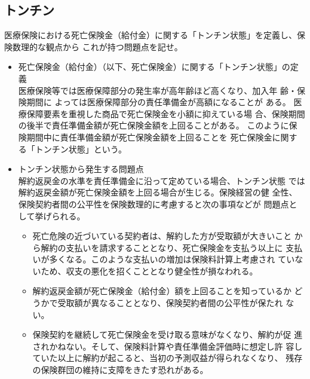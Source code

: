 \documentclass[report,gutter=10mm,fore-edge=10mm,uplatex,dvipdfmx]{jlreq}
\begin{document}
\subsection{トンチン}
医療保険における死亡保険金（給付金）に関する「トンチン状態」を定義し、保険数理的な観点から
これが持つ問題点を記せ。
\begin{itemize}
 \item  死亡保険金（給付金）（以下、死亡保険金）に関する「トンチン状態」の定義\\
 医療保険等では医療保障部分の発生率が高年齢ほど高くなり、加入年 齢・保険期間に
よっては医療保障部分の責任準備金が高額になることが ある。
医療保障要素を重視した商品で死亡保険金を小額に抑えている場
 合、保険期間の後半で責任準備金額が死亡保険金額を上回ることがある。
 このように保険期間中に責任準備金額が死亡保険金額を上回ることを
 死亡保険金に関する「トンチン状態」という。
 \item  トンチン状態から発生する問題点\\
 解約返戻金の水準を責任準備金に沿って定めている場合、トンチン状態
 では解約返戻金額が死亡保険金額を上回る場合が生じる。保険経営の健
 全性、保険契約者間の公平性を保険数理的に考慮すると次の事項などが
 問題点として挙げられる。
\begin{itemize}
 \item  死亡危険の近づいている契約者は、解約した方が受取額が大きいこと
 から解約の支払いを請求することとなり、死亡保険金を支払う以上に
 支払いが多くなる。このような支払いの増加は保険料計算上考慮され
 ていないため、収支の悪化を招くこととなり健全性が損なわれる。
 \item  解約返戻金額が死亡保険金（給付金）額を上回ることを知っているか
 どうかで受取額が異なることとなり、保険契約者間の公平性が保たれ
 ない。
 \item  保険契約を継続して死亡保険金を受け取る意味がなくなり、解約が促
 進されかねない。そして、保険料計算や責任準備金評価時に想定し許
 容していた以上に解約が起こると、当初の予測収益が得られなくなり、
 残存の保険群団の維持に支障をきたす恐れがある。
\end{itemize}
\end{itemize}
\end{document}
